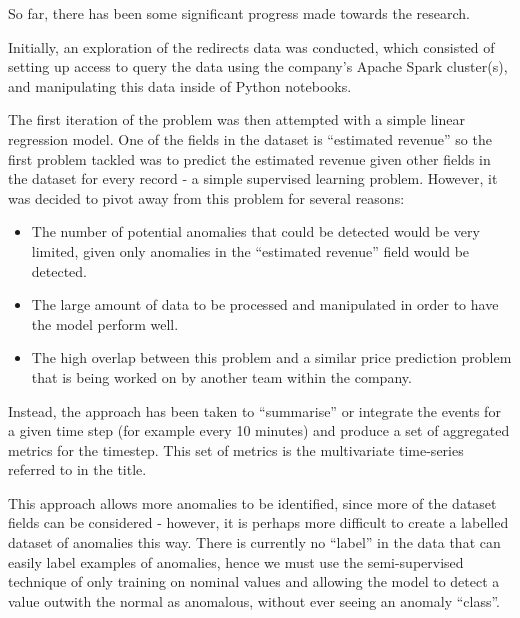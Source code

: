 \documentclass{mproj}
\begin{document}
So far, there has been some significant progress made towards the research.

Initially, an exploration of the redirects data was conducted, which consisted of setting up access to query the data using the company's Apache Spark cluster(s), and manipulating this data inside of Python notebooks.

The first iteration of the problem was then attempted with a simple linear regression model. One of the fields in the dataset is ``estimated revenue'' so the first problem tackled was to predict the estimated revenue given other fields in the dataset for every record - a simple supervised learning problem. However, it was decided to pivot away from this problem for several reasons:

\begin{itemize}
	\item The number of potential anomalies that could be detected would be very limited, given only anomalies in the ``estimated revenue'' field would be detected.
	\item The large amount of data to be processed and manipulated in order to have the model perform well.
	\item The high overlap between this problem and a similar price prediction problem that is being worked on by another team within the company.
\end{itemize}

Instead, the approach has been taken to ``summarise'' or integrate the events for a given time step (for example every 10 minutes) and produce a set of aggregated metrics for the timestep. This set of metrics is the multivariate time-series referred to in the title.

This approach allows more anomalies to be identified, since more of the dataset fields can be considered - however, it is perhaps more difficult to create a labelled dataset of anomalies this way. There is currently no ``label'' in the data that can easily label examples of anomalies, hence we must use the semi-supervised technique of only training on nominal values and allowing the model to detect a value outwith the normal as anomalous, without ever seeing an anomaly ``class''.
\end{document}
